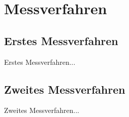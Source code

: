 \chapter{Messverfahren}
\label{sec:Aufbau}

\section{Erstes Messverfahren}

Erstes Messverfahren...

\section{Zweites Messverfahren}

Zweites Messverfahren...